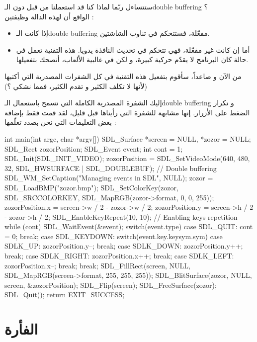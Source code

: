ستتساءل ربّما لماذا كنا قد استعملنا
من قبل دون الـ\textenglish{double buffering} ؟\\
الواقع أن لهذه الدالة وظيفتين :

\begin{itemize}
	\item إذا كانت الـ\textenglish{double buffering}
	مفعّلة، فستتحكم في تناوب الشاشتين.
	\item أما إن كانت غير مفعّلة، فهي تتحكم في تحديث النافذة يدويا. هذه التقنية تعمل في حالة كان البرنامج لا يقدّم حركية كبيرة، و لكن في غالبية الألعاب، أنصحك بتفعيلها.
\end{itemize}

من الآن و صاعداً، سأقوم بتفعيل هذه التقنية في كل الشفرات المصدرية التي أكتبها (لأنها لا تكلف الكثير و تقدم الكثير، فمما نشكي ؟)

إليك الشفرة المصدرية الكاملة التي تسمح باستعمال الـ\textenglish{double buffering}
و تكرار الضغط على الأزرار. إنها مشابهة للشفرة التي رأيناها قبل قليل، لقد قمت فقط بإضافة بعض التعليمات التي نحن بصدد تعلّمها :

\begin{Csource}
int main(int argc, char *argv[])
{
	SDL_Surface *screen = NULL, *zozor = NULL;
	SDL_Rect zozorPosition;
	SDL_Event event;
	int cont = 1;
	SDL_Init(SDL_INIT_VIDEO);
	zozorPosition = SDL_SetVideoMode(640, 480, 32, SDL_HWSURFACE | SDL_DOUBLEBUF); // Double buffering
	SDL_WM_SetCaption("Managing events in SDL", NULL);
	zozor = SDL_LoadBMP("zozor.bmp");
	SDL_SetColorKey(zozor, SDL_SRCCOLORKEY, SDL_MapRGB(zozor->format, 0, 0, 255));
	zozorPosition.x = screen->w / 2 - zozor->w / 2;
	zozorPosition.y = screen->h / 2 - zozor->h / 2;
	SDL_EnableKeyRepeat(10, 10); // Enabling keys repetition
	while (cont)
	{
		SDL_WaitEvent(&event);
		switch(event.type)
		{
			case SDL_QUIT:
			cont = 0;
			break;
			case SDL_KEYDOWN:
			switch(event.key.keysym.sym)
			{
				case SDLK_UP:
				zozorPosition.y--;
				break;
				case SDLK_DOWN:
				zozorPosition.y++;
				break;
				case SDLK_RIGHT:
				zozorPosition.x++;
				break;
				case SDLK_LEFT:
				zozorPosition.x--;
				break;
			}
			break;
		}
		SDL_FillRect(screen, NULL, SDL_MapRGB(screen->format, 255, 255, 255));
		SDL_BlitSurface(zozor, NULL, screen, &zozorPosition);
		SDL_Flip(screen);
	}
	SDL_FreeSurface(zozor);
	SDL_Quit();
	return EXIT_SUCCESS;
}
\end{Csource}

\section{الفأرة}

